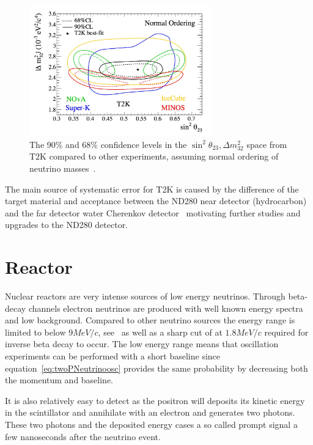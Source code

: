 \begin{figure}[h!]
\centering
  \centering
\includegraphics[width=0.7\textwidth]{figures/t2k2.jpeg}
\vspace{2mm}
\caption{The 90\% and 68\% confidence levels in the $\sin ^2 \theta_{23}, \Delta m^2_{32}$ space from T2K compared to other experiments, assuming normal ordering of neutrino masses~\cite{T2Kfigures}.}
\label{fig:T2K23}
\end{figure}

The main source of systematic error for T2K is caused by the difference of the target material and acceptance between the ND280 near detector (hydrocarbon) and the far detector water Cherenkov detector~\cite{T2Kpaper} motivating further studies and upgrades to the ND280 detector.

\pagebreak
\newpage
\section{Reactor}
Nuclear reactors are very intense sources of low energy neutrinos. Through beta-decay channels electron neutrinos are produced with well known energy spectra and low background. Compared to other neutrino sources the energy range is limited to below $9 MeV/c$, see~ as well as a sharp cut of at $1.8 MeV/c$ required for inverse beta decay to occur. The low energy range means that oscillation experiments can be performed with a short baseline since equation~\ref{eq:twoPNeutrinoosc} provides the same probability by decreasing both the momentum and baseline.

It is also relatively easy to detect as the positron will deposits its kinetic energy in the scintillator and annihilate with an electron and generates two photons. These two photons and the deposited energy cases a so called prompt signal a few nanoseconds after the neutrino event. 

